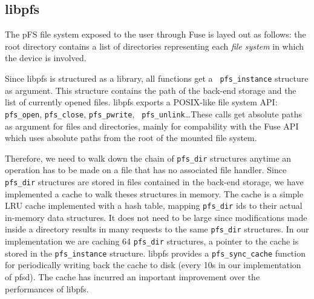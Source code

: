 
\subsection {libpfs}

The pFS file system exposed to the user through Fuse is layed
out as follows: the root directory contains a list of directories
representing each \emph{file system} in which the device is
involved. 

Since libpfs is structured as a library, all functions get a {\tt
  pfs\_instance} structure as argument. This structure contains the
path of the back-end storage and the list of currently opened
files. libpfs exports a POSIX-like file system API: {\tt
  pfs\_open}, {\tt pfs\_close}, {\tt pfs\_pwrite}, {\tt
  pfs\_unlink}\ldots These calls get absolute paths as argument for
files and directories, mainly for compability with the Fuse API which
uses absolute paths from the root of the mounted file system.

Therefore, we need to walk down the chain of {\tt pfs\_dir} structures
anytime an operation has to be made on a file that has no associated
file handler. Since {\tt pfs\_dir} structures are stored in files
contained in the back-end storage, we have implemented a cache to walk
theses structures in memory. 
The cache is a simple LRU cache implemented with a hash table, mapping
{\tt pfs\_dir} ids to their actual in-memory data structures. It does
not need to be large since modifications made inside a directory
results in many requests to the same {\tt pfs\_dir} structures. In our
implementation we are caching 64 {\tt pfs\_dir} structures, a pointer
to the cache is stored in the {\tt pfs\_instance} structure. libpfs
provides a {\tt pfs\_sync\_cache} function for periodically writing
back the cache to disk (every 10s in our implementation of pfsd). The
cache has incurred an important improvement over the performances of
libpfs.

